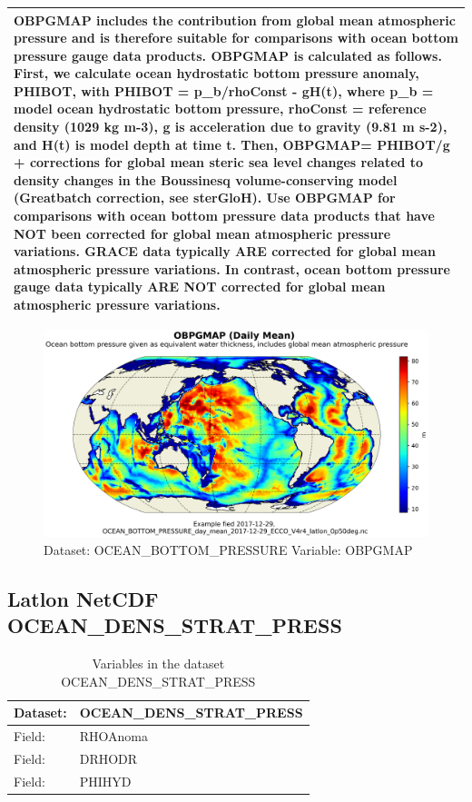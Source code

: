 \begin{longtable}{|m{}|m{}|m{}|m{}|}
\multicolumn{4}{|p{1\textwidth}|}{OBPGMAP includes the contribution from global mean atmospheric pressure and is therefore suitable for comparisons with ocean bottom pressure gauge data products. OBPGMAP is calculated as follows. First, we calculate ocean hydrostatic bottom pressure anomaly, PHIBOT, with PHIBOT = p\_b/rhoConst - gH(t), where p\_b = model ocean hydrostatic bottom pressure, rhoConst = reference density (1029 kg m-3), g is acceleration due to gravity (9.81 m s-2), and H(t) is model depth at time t. Then, OBPGMAP= PHIBOT/g + corrections for global mean steric sea level changes related to density changes in the Boussinesq volume-conserving model (Greatbatch correction, see sterGloH). Use OBPGMAP for comparisons with ocean bottom pressure data products that have NOT been corrected for global mean atmospheric pressure variations. GRACE data typically ARE corrected for global mean atmospheric pressure variations. In contrast, ocean bottom pressure gauge data typically ARE NOT corrected for global mean atmospheric pressure variations.} \\ \hline
\end{longtable}

\begin{figure}[H]
\centering
\includegraphics[scale=0.55]{../images/plots/latlon_plots/Ocean_Bottom_Pressure/OBPGMAP.png}
\caption{Dataset: OCEAN\_BOTTOM\_PRESSURE Variable: OBPGMAP}
\label{tab:table-OCEAN_BOTTOM_PRESSURE_OBPGMAP-Plot}
\end{figure}
\pagebreak
\subsection{Latlon NetCDF OCEAN\_DENS\_STRAT\_PRESS}
\newp
\begin{longtable}{|p{}|p{}|}
\caption{Variables in the dataset OCEAN\_DENS\_STRAT\_PRESS}
\label{tab:table-OCEAN_DENS_STRAT_PRESS-fields} \\ 
\hline \endhead \hline \endfoot
\rowcolor{lightgray} \textbf{Dataset:} & \textbf{OCEAN\_DENS\_STRAT\_PRESS} \\ \hline
Field: &RHOAnoma \\ \hline
Field: &DRHODR \\ \hline
Field: &PHIHYD \\ \hline
\end{longtable}


